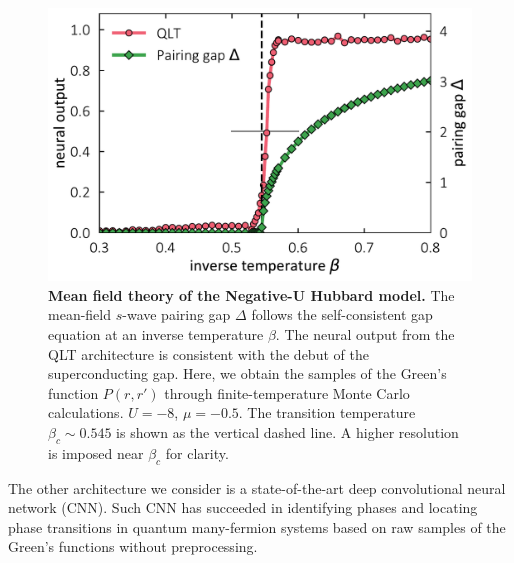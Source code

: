 \documentclass[amsmath,amssymb, aps, prl, twocolumn]{revtex4-1}
\begin{document}
\begin{figure}
\includegraphics[scale=.43]{fig2.pdf}
\caption{{\bf Mean field theory of the Negative-U Hubbard model.} The mean-field $s$-wave pairing gap $\Delta$ follows the self-consistent gap equation at an inverse temperature $\beta$. The neural output from the QLT architecture is consistent with the debut of the superconducting gap. Here, we obtain the samples of the Green's function $P(r, r')$ through finite-temperature Monte Carlo calculations. $U=-8$, $\mu=-0.5$. The transition temperature $\beta_c\sim 0.545$ is shown as the vertical dashed line. A higher resolution is imposed near $\beta_c$ for clarity.}\label{fig:mlmft}
\end{figure}


 The other architecture we consider is a state-of-the-art deep convolutional neural network (CNN). Such CNN has succeeded in identifying phases and locating phase transitions in quantum many-fermion systems based on raw samples of the Green's functions\cite{Simon2016} without preprocessing. %
\end{document}
